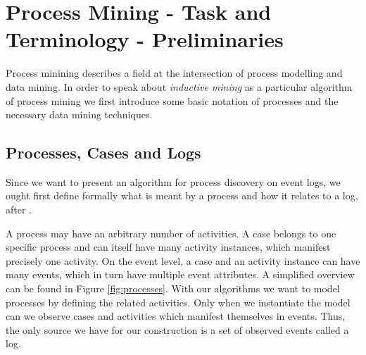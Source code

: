 \documentclass[a4paper]{IEEEtran}
\begin{document}
\section{Process Mining - Task and Terminology - Preliminaries}
\label{sec:terminology}
Process minining describes a field at the intersection of process modelling and data mining. In order to speak about \textit{inductive mining} as a particular algorithm of process mining we first introduce some basic notation of processes and the necessary data mining techniques. 
\subsection{Processes, Cases and Logs}
Since we want to present an algorithm for process discovery on event logs, we ought first define formally what is meant by a process and how it relates to a log, after \cite{process_mining}.

A process may have an arbitrary number of activities. A case belongs to one specific process and can itself have many activity instances, which manifest precisely one activity. On the event level, a case and an activity instance can have many events, which in turn have multiple event attributes. A simplified overview  can be found in Figure \ref{fig:processes}. With our algorithms we want to model processes by defining the related activities. Only when we instantiate the model can we observe cases and activities which manifest themselves in events. Thus, the only source we have for our construction is a set of observed events called a log.  
\end{document}
